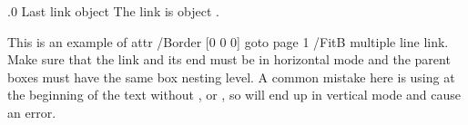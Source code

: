 .0 {Last link object}
The link is object \the\pdflastlink.
\endfeature






{ \raggedright \noindent
    This is an example of
    \pdfstartlink
        attr{ /Border [0 0 0]}  %
        goto page 1 {/FitB}%
    \Red multiple line link. Make sure that the link and
    its end must be in horizontal mode and the parent boxes must have the
    same box nesting level.\Black
    \pdfendlink
    A common mistake here is using \cs{\pdfstartlink} at the
    beginning of the text without \cs{\indent}, \cs{\noindent}
    or \cs{\leavevmode}, so \cs{\pdfstartlink}
    will end up in vertical mode and cause an error.
    \par}




